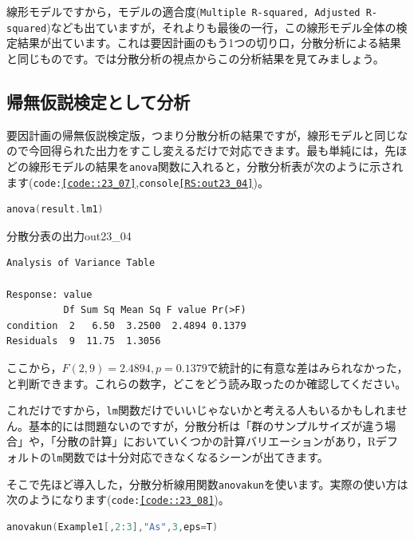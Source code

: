 \documentclass{ltjsarticle}
\begin{document}
線形モデルですから，モデルの適合度(\texttt{Multiple R-squared, Adjusted R-squared})なども出ていますが，それよりも最後の一行，この線形モデル全体の検定結果が出ています。これは要因計画のもう1つの切り口，分散分析による結果と同じものです。では分散分析の視点からこの分析結果を見てみましょう。

\subsection{帰無仮説検定として分析}
要因計画の帰無仮説検定版，つまり分散分析の結果ですが，線形モデルと同じなので今回得られた出力をすこし変えるだけで対応できます。最も単純には，先ほどの線形モデルの結果を\texttt{anova}関数に入れると，分散分析表が次のように示されます(\texttt{code:\ref{code::23_07}},\texttt{console\ref{RS:out23_04}})。


\begin{lstlisting}[language=c++,label={code::23_07},caption={分散分析としてみる}]
anova(result.lm1)
\end{lstlisting}


\begin{Rscreen}{分散分表の出力}{out23_04}
\begin{verbatim}
Analysis of Variance Table

Response: value
          Df Sum Sq Mean Sq F value Pr(>F)
condition  2   6.50  3.2500  2.4894 0.1379
Residuals  9  11.75  1.3056   
\end{verbatim}
\end{Rscreen}
ここから，$F(2,9)=2.4894,p=0.1379$で統計的に有意な差はみられなかった，と判断できます。これらの数字，どこをどう読み取ったのか確認してください。

これだけですから，\texttt{lm}関数だけでいいじゃないかと考える人もいるかもしれません。基本的には問題ないのですが，分散分析は「群のサンプルサイズが違う場合」や，「分散の計算」においていくつかの計算バリエーションがあり，Rデフォルトの\texttt{lm}関数では十分対応できなくなるシーンが出てきます。

そこで先ほど導入した，分散分析線用関数\texttt{anovakun}を使います。実際の使い方は次のようになります(\texttt{code:\ref{code::23_08}})。
\begin{lstlisting}[language=c++,label={code::23_08},caption={anovakunで実行}]
anovakun(Example1[,2:3],"As",3,eps=T)
\end{lstlisting}
\end{document}
